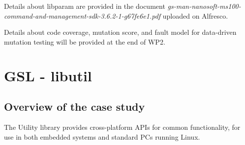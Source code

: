 Details about libparam are provided in the document \emph{gs-man-nanosoft-ms100-command-and-management-sdk-3.6.2-1-g67fe6e1.pdf} uploaded on Alfresco.



Details about code coverage, mutation score, and fault model for data-driven mutation testing will be provided at the end of WP2.

%
%
%


\section{GSL - libutil}
\label{sec:caseStudies:GSL:libutil}

\subsection{Overview of the case study}

The Utility library provides cross-platform APIs for common functionality, for use in both embedded systems and standard PCs running Linux. 

